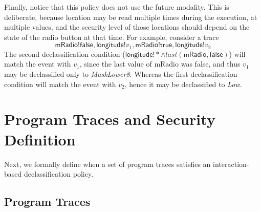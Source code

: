 \documentclass{llncs}
\newcommand{\code}[1]{\textsf{#1}} \newcommand{\bcode}[1]{\texttt{#1}}
\newcommand{\tlast}[2]{\textit{last}(#1, #2)}
\begin{document}
Finally, notice that this policy does not use the future
modality. This is deliberate, because location may be read multiple
times during the execution, at multiple values, and the security level
of those locations should depend on the state of the
radio button at that time. For example, consider a trace
\begin{displaymath}
   \code{mRadio!false}, \code{longitude!}v_1,
    \code{mRadio!true}, \code{longitude!}v_2
\end{displaymath}
The second declassification condition ($\code{longitude}!\ast \wedge
\tlast{\code{mRadio}}{\code{false}}$) will match the event with $v_1$, since
the last value of \code{mRadio} was \code{false}, and
thus $v_1$ may be declassified only to \textit{MaskLower8}. Whereas
the first declassification condition will match the event with $v_2$, hence it
may be declassified to \textit{Low}.

\section{Program Traces and Security Definition}
\label{sec:formalism}

Next, we formally define when a set of program traces satisfies an
interaction-based declassification policy.

\subsection{Program Traces}
\label{sec:traces}
\end{document}
